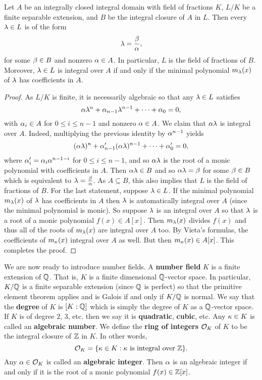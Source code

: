     \begin{proposition}\label{prop:field_of_fractions_AKBL}
      Let $A$ be an integrally closed integral domain with field of fractions $K$, $L/K$ be a finite separable extension, and $B$ be the integral closure of $A$ in $L$. Then every $\lambda \in L$ is of the form
      \[
        \lambda = \frac{\beta}{\alpha},
      \]
      for some $\beta \in B$ and nonzero $\alpha \in A$. In particular, $L$ is the field of fractions of $B$. Moreover, $\lambda \in L$ is integral over $A$ if and only if the minimal polynomial $m_{\lambda}(x)$ of $\lambda$ has coefficients in $A$.
    \end{proposition}
    \begin{proof}
      As $L/K$ is finite, it is necessarily algebraic so that any $\lambda \in L$ satisfies
      \[
        \alpha\lambda^{n}+\alpha_{n-1}\lambda^{n-1}+\cdots+\alpha_{0} = 0,
      \]
      with $\alpha_{i} \in A$ for $0 \le i \le n-1$ and nonzero $\alpha \in A$. We claim that $\alpha\lambda$ is integral over $A$. Indeed, multiplying the previous identity by $\alpha^{n-1}$ yields
      \[
        (\alpha\lambda)^{n}+\alpha'_{n-1}(\alpha\lambda)^{n-1}+\cdots+\alpha'_{0} = 0,
      \]
      where $\alpha'_{i} = \alpha_{i}\alpha^{n-1-i}$ for $0 \le i \le n-1$, and so $\alpha\lambda$ is the root of a monic polynomial with coefficients in $A$. Then $\alpha\lambda \in B$ and so $\alpha\lambda = \beta$ for some $\beta \in B$ which is equivalent to $\lambda = \frac{\beta}{\alpha}$. As $A \subseteq B$, this also implies that $L$ is the field of fractions of $B$. For the last statement, suppose $\lambda \in L$. If the minimal polynomial $m_{\lambda}(x)$ of $\lambda$ has coefficients in $A$ then $\lambda$ is automatically integral over $A$ (since the minimal polynomial is monic). So suppose $\lambda$ is an integral over $A$ so that $\lambda$ is a root of a monic polynomial $f(x) \in A[x]$. Then $m_{\lambda}(x)$ divides $f(x)$ and thus all of the roots of $m_{\lambda}(x)$ are integral over $A$ too. By Vieta's formulas, the coefficients of $m_{\kappa}(x)$ integral over $A$ as well. But then $m_{\kappa}(x) \in A[x]$. This completes the proof.
    \end{proof}

    We are now ready to introduce number fields. A \textbf{number field} $K$ is a finite extension of $\mathbb{Q}$. That is, $K$ is a finite dimensional $\mathbb{Q}$-vector space. In particular, $K/\mathbb{Q}$ is a finite separable extension (since $\mathbb{Q}$ is perfect) so that the primitive element theorem applies and is Galois if and only if $K/\mathbb{Q}$ is normal. We say that the \textbf{degree} of $K$ is $[K:\mathbb{Q}]$ which is simply the degree of $K$ as a $\mathbb{Q}$-vector space. If $K$ is of degree $2$, $3$, etc. then we say it is \textbf{quadratic}, \textbf{cubic}, etc. Any $\kappa \in K$ is called an \textbf{algebraic number}. We define the \textbf{ring of integers} $\mathcal{O}_{K}$ of $K$ to be the integral closure of $\mathbb{Z}$ in $K$. In other words,
    \[
      \mathcal{O}_{K} = \{\kappa \in K:\text{$\kappa$ is integral over $\mathbb{Z}$}\}.
    \]
    Any $\alpha \in \mathcal{O}_{K}$ is called an \textbf{algebraic integer}. Then $\alpha$ is an algebraic integer if and only if it is the root of a monic polynomial $f(x) \in \mathbb{Z}[x]$.

